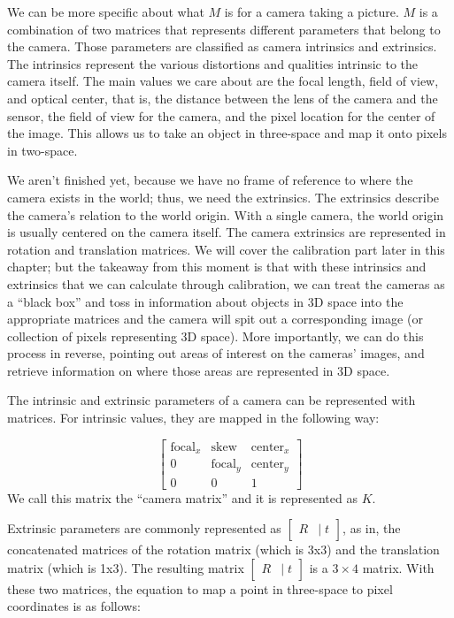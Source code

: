 \documentclass[
    12pt,
    twoside,
    bibstyle=chicago,
    headerstyle=uppercase,
	bibfile=thesis.bib
]{reedthesis}
\newcommand{\rt}{\left[\begin{smallmatrix}R &|\; t\end{smallmatrix}\right]}
\begin{document}
We can be more specific about what $M$ is for a camera taking a picture. $M$ is a combination of two matrices that represents different parameters that belong to the camera. Those parameters are classified as camera intrinsics and extrinsics. The intrinsics represent the various distortions and qualities intrinsic to the camera itself. The main values we care about are the focal length, field of view, and optical center, that is, the distance between the lens of the camera and the sensor, the field of view for the camera, and the pixel location for the center of the image. This allows us to take an object in three-space and map it onto pixels in two-space. 

We aren't finished yet, because we have no frame of reference to where the camera exists in the world; thus, we need the extrinsics. The extrinsics describe the camera's relation to the world origin. With a single camera, the world origin is usually centered on the camera itself. The camera extrinsics are represented in rotation and translation matrices. We will cover the calibration part later in this chapter; but the takeaway from this moment is that with these intrinsics and extrinsics that we can calculate through calibration, we can treat the cameras as a “black box” and toss in information about objects in 3D space into the appropriate matrices and the camera will spit out a corresponding image (or collection of pixels representing 3D space). More importantly, we can do this process in reverse, pointing out areas of interest on the cameras' images, and retrieve information on where those areas are represented in 3D space.

The intrinsic and extrinsic parameters of a camera can be represented with matrices. For intrinsic values, they are mapped in the following way:

\[\begin{bmatrix}
\text{focal}_x & \text{skew} & \text{center}_x \\
0 & \text{focal}_y & \text{center}_y \\
0 & 0 & 1
\end{bmatrix}\] We call this matrix the “camera matrix” and it is represented as $K$.

Extrinsic parameters are commonly represented as $\rt$, as in, the concatenated matrices of the rotation matrix (which is 3x3) and the translation matrix (which is 1x3). The resulting matrix $\rt$ is a $3\times4$ matrix. With these two matrices, the equation to map a point in three-space to pixel coordinates is as follows:
\end{document}
